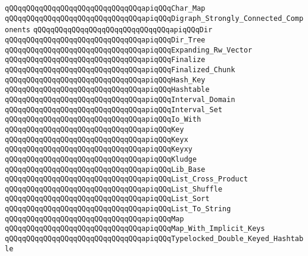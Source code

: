\verb|qQQqqQQqqQQqqQQqqQQqqQQqqQQqqQQqapiqQQqChar_Map|\newline
\verb|qQQqqQQqqQQqqQQqqQQqqQQqqQQqqQQqapiqQQqDigraph_Strongly_Connected_Components|\newline
\verb|qQQqqQQqqQQqqQQqqQQqqQQqqQQqqQQqapiqQQqDir|\newline
\verb|qQQqqQQqqQQqqQQqqQQqqQQqqQQqqQQqapiqQQqDir_Tree|\newline
\newline
\verb|qQQqqQQqqQQqqQQqqQQqqQQqqQQqqQQqapiqQQqExpanding_Rw_Vector|\newline
\verb|qQQqqQQqqQQqqQQqqQQqqQQqqQQqqQQqapiqQQqFinalize|\newline
\verb|qQQqqQQqqQQqqQQqqQQqqQQqqQQqqQQqapiqQQqFinalized_Chunk|\newline
\verb|qQQqqQQqqQQqqQQqqQQqqQQqqQQqqQQqapiqQQqHash_Key|\newline
\verb|qQQqqQQqqQQqqQQqqQQqqQQqqQQqqQQqapiqQQqHashtable|\newline
\verb|qQQqqQQqqQQqqQQqqQQqqQQqqQQqqQQqapiqQQqInterval_Domain|\newline
\verb|qQQqqQQqqQQqqQQqqQQqqQQqqQQqqQQqapiqQQqInterval_Set|\newline
\verb|qQQqqQQqqQQqqQQqqQQqqQQqqQQqqQQqapiqQQqIo_With|\newline
\verb|qQQqqQQqqQQqqQQqqQQqqQQqqQQqqQQqapiqQQqKey|\newline
\verb|qQQqqQQqqQQqqQQqqQQqqQQqqQQqqQQqapiqQQqKeyx|\newline
\verb|qQQqqQQqqQQqqQQqqQQqqQQqqQQqqQQqapiqQQqKeyxy|\newline
\verb|qQQqqQQqqQQqqQQqqQQqqQQqqQQqqQQqapiqQQqKludge|\newline
\verb|qQQqqQQqqQQqqQQqqQQqqQQqqQQqqQQqapiqQQqLib_Base|\newline
\verb|qQQqqQQqqQQqqQQqqQQqqQQqqQQqqQQqapiqQQqList_Cross_Product|\newline
\verb|qQQqqQQqqQQqqQQqqQQqqQQqqQQqqQQqapiqQQqList_Shuffle|\newline
\verb|qQQqqQQqqQQqqQQqqQQqqQQqqQQqqQQqapiqQQqList_Sort|\newline
\verb|qQQqqQQqqQQqqQQqqQQqqQQqqQQqqQQqapiqQQqList_To_String|\newline
\verb|qQQqqQQqqQQqqQQqqQQqqQQqqQQqqQQqapiqQQqMap|\newline
\verb|qQQqqQQqqQQqqQQqqQQqqQQqqQQqqQQqapiqQQqMap_With_Implicit_Keys|\newline
\verb|qQQqqQQqqQQqqQQqqQQqqQQqqQQqqQQqapiqQQqTypelocked_Double_Keyed_Hashtable|\newline
